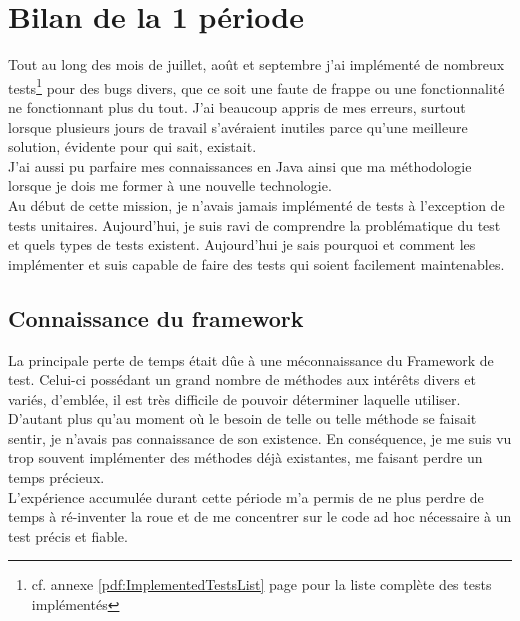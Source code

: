 \section{Bilan de la 1 période}
Tout au long des mois de juillet, ao\^{u}t et septembre j'ai impl\'{e}menté de nombreux tests\footnote{cf. annexe \ref{pdf:ImplementedTestsList} page \pageref{pdf:ImplementedTestsList} pour la liste compl\`{e}te des tests impl\'{e}ment\'{e}s} pour des bugs divers, que ce soit une faute de frappe ou une fonctionnalité ne fonctionnant plus du tout. J'ai beaucoup appris de mes erreurs, surtout lorsque plusieurs jours de travail s'av\'{e}raient inutiles parce qu'une meilleure solution, \'{e}vidente pour qui sait, existait.\\
J'ai aussi pu parfaire mes connaissances en Java ainsi que ma méthodologie lorsque je dois me former à une nouvelle technologie.\\
Au début de cette mission, je n'avais jamais implémenté de tests à l'exception de tests unitaires. Aujourd'hui, je suis ravi de comprendre la problématique du test et quels types de tests existent. Aujourd'hui je sais pourquoi et comment les implémenter et suis capable de faire des tests qui soient facilement maintenables.



\subsection{Connaissance du framework}
La principale perte de temps était dûe à une méconnaissance du Framework de test. Celui-ci possédant un grand nombre de méthodes aux intérêts divers et variés, d'emblée, il est très difficile de pouvoir déterminer laquelle utiliser. D'autant plus qu'au moment où le besoin de telle ou telle méthode se faisait sentir, je n'avais pas connaissance de son existence. En conséquence, je me suis vu trop souvent implémenter des méthodes déjà existantes, me faisant perdre un temps précieux.\\
L'expérience accumulée durant cette période m'a permis de ne plus perdre de temps à ré-inventer la roue et de me concentrer sur le code ad hoc nécessaire à un test précis et fiable.

